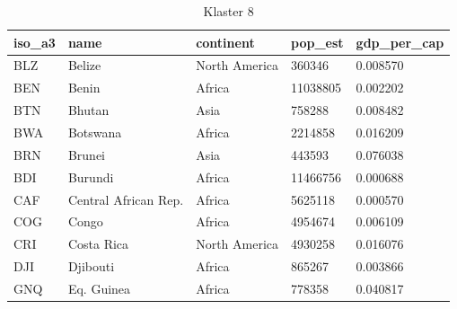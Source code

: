 \documentclass[11pt]{report}
\begin{document}
    \begin{table}[]
        \caption {Klaster 8} \label{tab:cl8}
        \begin{tabular}{lllll}
            \hline
            \multicolumn{1}{|l|}{iso\_a3} & \multicolumn{1}{l|}{name} & \multicolumn{1}{l|}{continent} & \multicolumn{1}{l|}{pop\_est} & \multicolumn{1}{l|}{gdp\_per\_cap} \\ \hline
            BLZ                           & Belize                    & North America                  & 360346                        & 0.008570                           \\
            BEN                           & Benin                     & Africa                         & 11038805                      & 0.002202                           \\
            BTN                           & Bhutan                    & Asia                           & 758288                        & 0.008482                           \\
            BWA                           & Botswana                  & Africa                         & 2214858                       & 0.016209                           \\
            BRN                           & Brunei                    & Asia                           & 443593                        & 0.076038                           \\
            BDI                           & Burundi                   & Africa                         & 11466756                      & 0.000688                           \\
            CAF                           & Central African Rep.      & Africa                         & 5625118                       & 0.000570                           \\
            COG                           & Congo                     & Africa                         & 4954674                       & 0.006109                           \\
            CRI                           & Costa Rica                & North America                  & 4930258                       & 0.016076                           \\
            DJI                           & Djibouti                  & Africa                         & 865267                        & 0.003866                           \\
            GNQ                           & Eq. Guinea                & Africa                         & 778358                        & 0.040817                           \\

\end{tabular}
\end{table}
\end{document}
